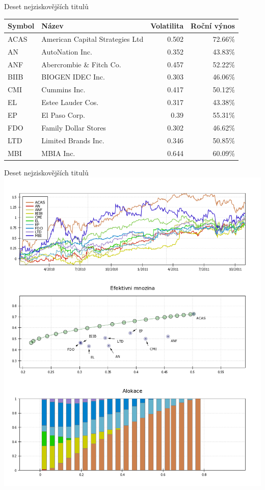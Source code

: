 \begin{frame}{Deset nejziskovějších titulů}
      \begin{tabular}{|l|l|r|r|}
        \hline
        Symbol&Název&Volatilita&Roční výnos\\\hline\hline
        ACAS&American Capital Strategies Ltd &0.502&72.66\%\\\hline
        AN&AutoNation Inc. &0.352&43.83\%\\\hline
        ANF&Abercrombie \& Fitch Co. &0.457&52.22\%\\\hline
        BIIB&BIOGEN IDEC Inc. &0.303&46.06\%\\\hline
        CMI&Cummins Inc. &0.417&50.12\%\\\hline
        EL&Estee Lauder Cos. &0.317&43.38\%\\\hline
        EP&El Paso Corp. &0.39&55.31\%\\\hline
        FDO&Family Dollar Stores &0.302&46.62\%\\\hline
        LTD&Limited Brands Inc. &0.346&50.85\%\\\hline
        MBI&MBIA Inc. &0.644&60.09\%\\\hline
      \end{tabular}
\end{frame}

\begin{frame}{Deset nejziskovějších titulů}
        \includegraphics[height=0.9\textheight]{top10.png}
\end{frame}

